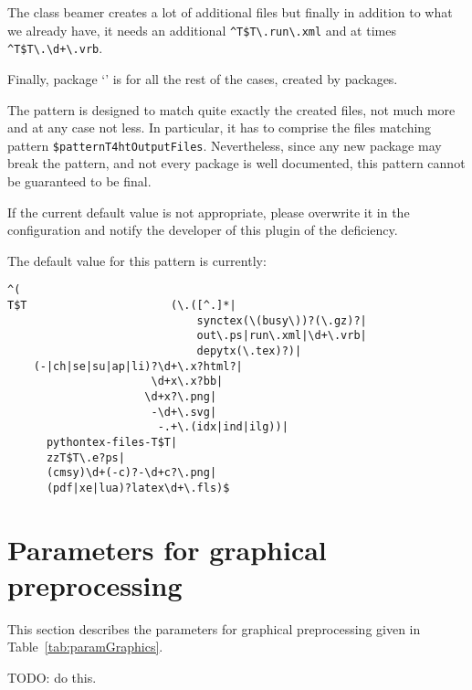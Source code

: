 The class beamer creates a lot of additional files 
but finally in addition to what we already have, 
it needs an additional \texttt{\^{}T\$T\textbackslash.run\textbackslash.xml} 
and at times \texttt{\^{}T\$T\textbackslash.\textbackslash d+\textbackslash.vrb}. 

Finally, package `' is for all the rest of the cases, created by packages. 


The pattern is designed 
to match quite exactly the created files, 
not much more and at any case not less. 
In particular, it has to comprise the files matching pattern 
\texttt{\$patternT4htOutputFiles}. 
Nevertheless, since any new package may break the pattern, 
and not every package is well documented, 
this pattern cannot be guaranteed to be final. 

If the current default value is not appropriate, 
please overwrite it in the configuration 
and notify the developer of this plugin of the deficiency. 

The default value for this pattern is currently: 
%
\begin{verbatim}
^(
T$T                      (\.([^.]*|
                             synctex(\(busy\))?(\.gz)?|
                             out\.ps|run\.xml|\d+\.vrb|
                             depytx(\.tex)?)|
    (-|ch|se|su|ap|li)?\d+\.x?html?|
                      \d+x\.x?bb|
                     \d+x?\.png|
                      -\d+\.svg|
                       -.+\.(idx|ind|ilg))|
      pythontex-files-T$T|
      zzT$T\.e?ps|
      (cmsy)\d+(-c)?-\d+c?\.png|
      (pdf|xe|lua)?latex\d+\.fls)$
\end{verbatim}


\section{Parameters for graphical preprocessing}\label{sec:settingsGraph}

This section describes the parameters for graphical preprocessing 
given in Table~\ref{tab:paramGraphics}. 

TODO\@: do this. 


